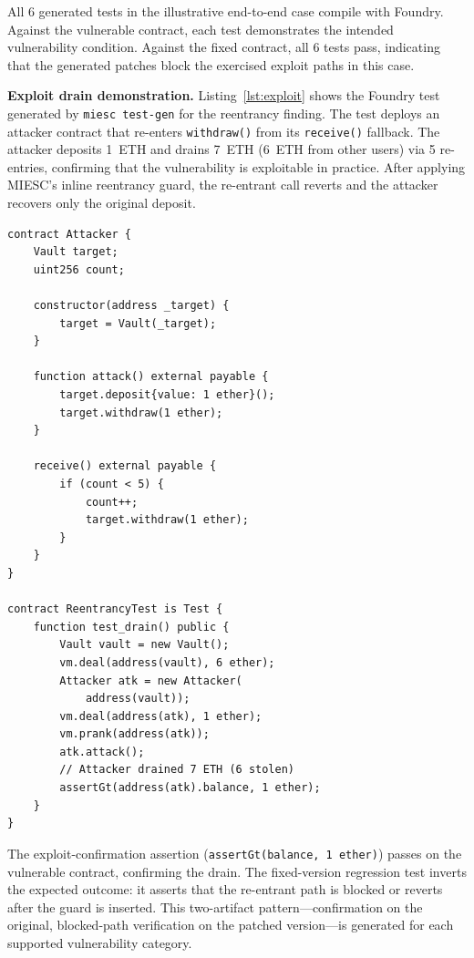 \documentclass[conference]{IEEEtran}
\begin{document}
All 6 generated tests in the illustrative end-to-end case compile with Foundry. Against the vulnerable contract, each test demonstrates the intended vulnerability condition. Against the fixed contract, all 6 tests pass, indicating that the generated patches block the exercised exploit paths in this case.

\textbf{Exploit drain demonstration.} Listing~\ref{lst:exploit} shows the Foundry test generated by \texttt{miesc test-gen} for the reentrancy finding. The test deploys an attacker contract that re-enters \texttt{withdraw()} from its \texttt{receive()} fallback. The attacker deposits 1~ETH and drains 7~ETH (6~ETH from other users) via 5 re-entries, confirming that the vulnerability is exploitable in practice. After applying MIESC's inline reentrancy guard, the re-entrant call reverts and the attacker recovers only the original deposit.

\begin{lstlisting}[caption={Generated exploit test for reentrancy (simplified)},label={lst:exploit},float=htbp]
contract Attacker {
    Vault target;
    uint256 count;

    constructor(address _target) {
        target = Vault(_target);
    }

    function attack() external payable {
        target.deposit{value: 1 ether}();
        target.withdraw(1 ether);
    }

    receive() external payable {
        if (count < 5) {
            count++;
            target.withdraw(1 ether);
        }
    }
}

contract ReentrancyTest is Test {
    function test_drain() public {
        Vault vault = new Vault();
        vm.deal(address(vault), 6 ether);
        Attacker atk = new Attacker(
            address(vault));
        vm.deal(address(atk), 1 ether);
        vm.prank(address(atk));
        atk.attack();
        // Attacker drained 7 ETH (6 stolen)
        assertGt(address(atk).balance, 1 ether);
    }
}
\end{lstlisting}

The exploit-confirmation assertion (\texttt{assertGt(balance, 1 ether)}) passes on the vulnerable contract, confirming the drain. The fixed-version regression test inverts the expected outcome: it asserts that the re-entrant path is blocked or reverts after the guard is inserted. This two-artifact pattern---confirmation on the original, blocked-path verification on the patched version---is generated for each supported vulnerability category.
\end{document}
